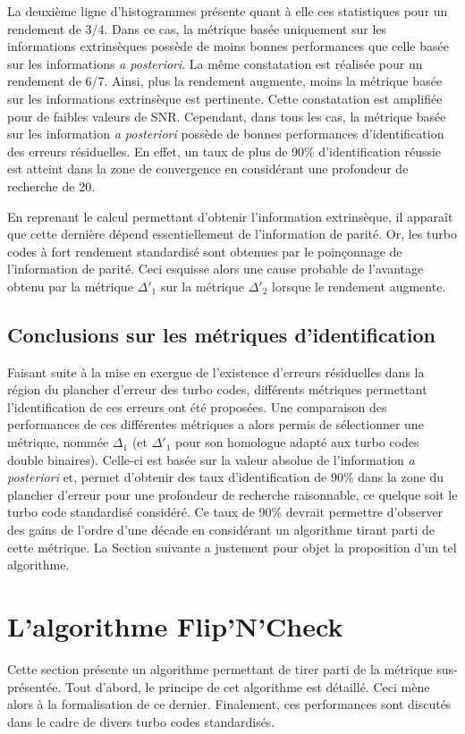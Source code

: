 La deuxième ligne d'histogrammes présente quant à elle ces statistiques  pour un rendement de 3/4. Dans ce cas, la 
métrique basée uniquement sur les informations extrinsèques possède de moins bonnes performances que celle basée sur les 
informations \textit{a posteriori}. La même constatation est réalisée pour un rendement de 6/7. Ainsi, plus la rendement 
augmente, moins la métrique basée sur les informations extrinsèque est pertinente. Cette constatation est amplifiée pour 
de faibles valeurs de SNR. Cependant, dans tous les cas, la métrique basée sur les information \textit{a posteriori} 
possède de bonnes performances d'identification des erreurs résiduelles. En effet, un taux de plus de 90\% d'identification 
réussie est atteint dans la zone de convergence en considérant une profondeur de recherche de 20. 

En reprenant le calcul permettant d'obtenir l'information extrinsèque, il apparaît que cette dernière dépend essentiellement
de l'information de parité. Or, les turbo codes à fort rendement standardisé sont obtenues par le poinçonnage de l'information
de parité. Ceci esquisse alors une cause probable de l'avantage obtenu par la métrique $\Delta'_1$ sur la métrique $\Delta'_2$
lorsque le rendement augmente.

\subsection{Conclusions sur les métriques d'identification}
Faisant suite à la mise en exergue de l'existence d'erreurs résiduelles dans la région du plancher d'erreur des turbo codes,
différents métriques permettant l'identification de ces erreurs ont été proposées. Une comparaison des performances de ces 
différentes métriques a alors permis de sélectionner une métrique, nommée $\Delta_1$ (et $\Delta'_1$ pour son homologue 
adapté aux turbo codes double binaires). Celle-ci est basée sur la valeur absolue de l'information \textit{a posteriori}
et, permet d'obtenir des taux d'identification de 90\% dans la zone du plancher d'erreur pour une profondeur de recherche 
raisonnable, ce quelque soit le turbo code standardisé considéré. Ce taux de 90\% devrait permettre d'observer des gains 
de l'ordre d'une décade en considérant un algorithme tirant parti de cette métrique. La Section suivante a justement pour 
objet la proposition d'un tel algorithme.

\section{L'algorithme Flip'N'Check}
Cette section présente un algorithme permettant de tirer parti de la métrique sus-présentée. Tout d'abord, le 
principe de cet algorithme est détaillé. Ceci mène alors à la formalisation de ce dernier. Finalement, ces performances 
sont discutés dans le cadre de divers turbo codes standardisés.

